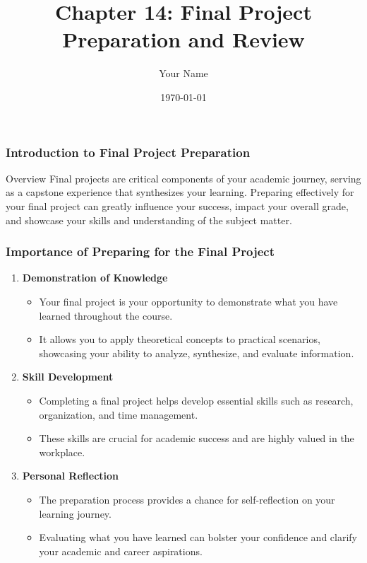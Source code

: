\documentclass{beamer}
\title{Chapter 14: Final Project Preparation and Review}
\author{Your Name}
\institute{Your Institution}
\date{\today}
\begin{document}
\frame{\titlepage}

\begin{frame}[fragile]
    \frametitle{Introduction to Final Project Preparation}
    \begin{block}{Overview}
        Final projects are critical components of your academic journey, serving as a capstone experience that synthesizes your learning. Preparing effectively for your final project can greatly influence your success, impact your overall grade, and showcase your skills and understanding of the subject matter.
    \end{block}
\end{frame}

\begin{frame}[fragile]
    \frametitle{Importance of Preparing for the Final Project}
    \begin{enumerate}
        \item \textbf{Demonstration of Knowledge}
        \begin{itemize}
            \item Your final project is your opportunity to demonstrate what you have learned throughout the course.
            \item It allows you to apply theoretical concepts to practical scenarios, showcasing your ability to analyze, synthesize, and evaluate information.
        \end{itemize}
        
        \item \textbf{Skill Development}
        \begin{itemize}
            \item Completing a final project helps develop essential skills such as research, organization, and time management.
            \item These skills are crucial for academic success and are highly valued in the workplace.
        \end{itemize}
        
        \item \textbf{Personal Reflection}
        \begin{itemize}
            \item The preparation process provides a chance for self-reflection on your learning journey.
            \item Evaluating what you have learned can bolster your confidence and clarify your academic and career aspirations.
        \end{itemize}
    \end{enumerate}
\end{frame}
\end{document}
